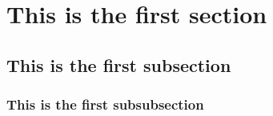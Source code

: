 \section{This is the first section}
\lipsum
\subsection{This is the first subsection}
\lipsum
\subsubsection{This is the first subsubsection}
\lipsum 
